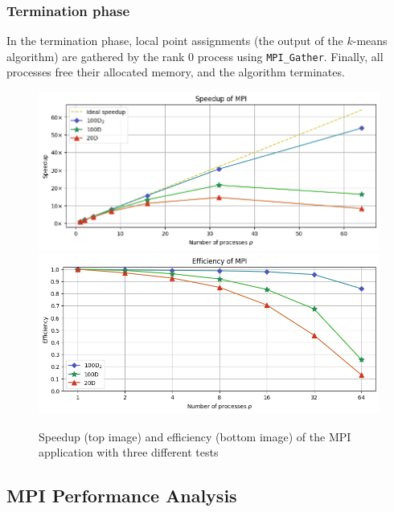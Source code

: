 \documentclass[11pt, journal]{IEEEtran}
\begin{document}
\subsubsection{Termination phase}

In the termination phase, local point assignments (the output of the $k$-means algorithm) are gathered by the rank 0 process using \verb|MPI_Gather|. Finally, all processes free their allocated memory, and the algorithm terminates.

\begin{figure}
    \label{mpi_speedup_eff}
    \centering
    \includegraphics[width=\linewidth]{imgs/mpi_speedup.png}
    \includegraphics[width=\linewidth]{imgs/mpi_efficiency.png}
    \caption{Speedup (top image) and efficiency (bottom image) of the MPI application with three different tests}
\end{figure}

\subsection{MPI Performance Analysis}
\end{document}
